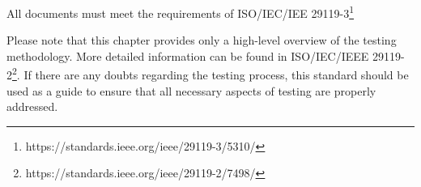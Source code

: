 All documents must meet the requirements of ISO/IEC/IEE 29119-3\footnote{https://standards.ieee.org/ieee/29119-3/5310/}

Please note that this chapter provides only a high-level overview of the testing methodology. More detailed information can be found in ISO/IEC/IEEE 29119-2\footnote{https://standards.ieee.org/ieee/29119-2/7498/}. If there are any doubts regarding the testing process, this standard should be used as a guide to ensure that all necessary aspects of testing are properly addressed.















